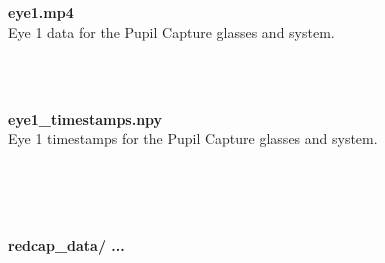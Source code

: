 \begin{description}
\begin{addmargin}[0em]{0em}
    \textbf{\\\\}
    \begin{addmargin}[1em]{0em} %
        \textbf{eye1.mp4}\\
        Eye 1 data for the Pupil Capture glasses and system.
    \end{addmargin} %

    \textbf{\\\\}
    \begin{addmargin}[1em]{0em} %
        \textbf{eye1\_timestamps.npy}\\
        Eye 1 timestamps for the Pupil Capture glasses and system.
    \end{addmargin} %

\end{addmargin} %



\textbf{\\\\\\}
\begin{addmargin}[0em]{0em} %
    \textbf{redcap\_data/ ... }


\end{addmargin}
\end{description}
